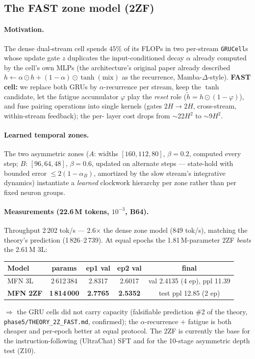 \documentclass[11pt]{article}
\begin{document}
\subsection{The FAST zone model (2ZF)}\label{sec:2zf}
\paragraph{Motivation.} The dense dual-stream cell spends $45\%$ of its
FLOPs in two per-stream \texttt{GRUCell}s whose update gate $z$ duplicates
the input-conditioned decay $\alpha$ already computed by the cell's own
MLPs (the architecture's original paper already described
$h \leftarrow \alpha \odot h + (1-\alpha)\odot\tanh(\text{mix})$ as the
recurrence, Mamba-$\Delta$-style). \textbf{FAST cell:} we replace both GRUs
by $\alpha$-recurrence per stream, keep the $\tanh$ candidate, let the
fatigue accumulator $\varphi$ play the \emph{reset} role
($\tilde h = h \odot (1-\varphi)$), and fuse pairing operations into single
kernels (gates $2H{\to}2H$, cross-stream, within-stream feedback); the per-
layer cost drops from $\sim$22$H^2$ to $\sim$9$H^2$.
\paragraph{Learned temporal zones.} The two asymmetric zones
($A$: widths $[160,112,80]$, $\beta{=}0.2$, computed every step; $B$:
$[96,64,48]$, $\beta{=}0.6$, updated on alternate steps --- state-hold with
bounded error $\leq 2(1-\alpha_B)$, amortized by the slow stream's
integrative dynamics) instantiate a \emph{learned} clockwork hierarchy per
zone rather than per fixed neuron groups.
\paragraph{Measurements (22.6\,M tokens, $10^{-3}$, B64).}
Throughput 2\,202 tok/s --- 2.6$\times$ the dense zone model (849 tok/s),
matching the theory's prediction (1\,826--2\,739). At equal epochs the
1.81\,M-parameter 2ZF \emph{beats} the 2.61\,M 3L:
\begin{center}\small
\begin{tabular}{lcccc}
\toprule
Model & params & ep1 val & ep2 val & final \\ \midrule
MFN 3L & 2\,612\,384 & 2.8317 & 2.6017 & val 2.4135 (4 ep), ppl 11.39 \\
\textbf{MFN 2ZF} & \textbf{1\,814\,000} & \textbf{2.7765} & \textbf{2.5352} & test ppl 12.85 (2 ep) \\
\bottomrule
\end{tabular}
\end{center}
$\Rightarrow$ the GRU cells did not carry capacity (falsifiable prediction
\#2 of the theory, \texttt{phase5/THEORY\_2Z\_FAST.md}, confirmed); the
$\alpha$-recurrence + fatigue is both cheaper and per-epoch better at equal
protocol. The 2ZF is currently the base for the instruction-following
(UltraChat) SFT and for the 10-stage asymmetric depth test (Z10).
\end{document}
